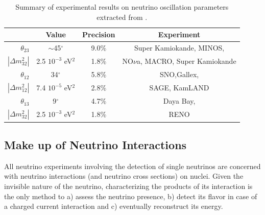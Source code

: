 \begin{table}[htpb]
\centering
\caption{Summary of experimental results on neutrino oscillation parameters extracted from \cite{PDGOsc}.}
\label{tab:nuosc}
\begin{tabular}{|r|c|c|c|}
\hline
        & Value   & Precision & Experiment \\
\hline
$\theta_{23}$            & $\sim$45$^\circ$                      & 9.0\%   & Super Kamiokande, MINOS,\\
$|\Delta m^2_{32}|$    & 2.5 $10^{-3}$ eV$^2$   & 1.8\% &  NO$\nu$a, MACRO, Super Kamiokande\\
\hline
$\theta_{12}$            & 34$^\circ$                     & 5.8\% &  SNO,Gallex,\\
$|\Delta m^2_{12}|$    & 7.4 $10^{-5}$ eV$^2$   & 2.8\% &  SAGE,  KamLAND \\
\hline
$\theta_{13}$            &   9$^\circ$                    & 4.7\%  & Daya  Bay, \\
$|\Delta m^2_{32}|$    & 2.5 $10^{-3}$ eV$^2$   & 1.8\% &  RENO\\
\hline
\end{tabular}
\end{table}

\subsection{Make up of Neutrino Interactions}\label{ch:NuInt}
All neutrino experiments involving the detection of single neutrinos are concerned with neutrino interactions (and neutrino cross sections) on nuclei. 
Given the invisible nature of the neutrino, characterizing the products of its interaction is the only method to a) assess the neutrino presence, b) detect its flavor in case of a charged current interaction and c) eventually reconstruct its energy. 

